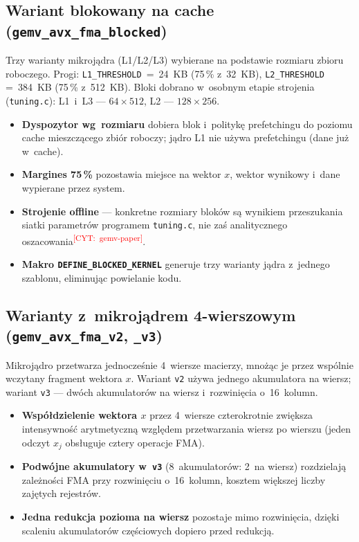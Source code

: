 \documentclass[a4paper,12pt]{book} %
\newcommand{\todocite}[1]{\textsuperscript{\textcolor{red}{[CYT:~#1]}}}
\newcommand{\kod}[1]{\texttt{#1}}
\begin{document}
\subsection{Wariant blokowany na cache (\kod{gemv\_avx\_fma\_blocked})}
Trzy warianty mikrojądra (L1/L2/L3) wybierane na podstawie rozmiaru zbioru
roboczego. Progi: \kod{L1\_THRESHOLD}~=~24~KB (75\,\% z~32~KB), \kod{L2\_THRESHOLD}
=~384~KB (75\,\% z~512~KB). Bloki dobrano w~osobnym etapie strojenia
(\kod{tuning.c}): L1~i~L3 --- \mbox{$64\times512$}, L2 --- \mbox{$128\times256$}.
\begin{itemize}
\item \textbf{Dyspozytor wg~rozmiaru} dobiera blok i~politykę prefetchingu do
  poziomu cache mieszczącego zbiór roboczy; jądro L1 nie używa prefetchingu
  (dane już w~cache).
\item \textbf{Margines 75\,\%} pozostawia miejsce na wektor $x$, wektor wynikowy
  i~dane wypierane przez system.
\item \textbf{Strojenie offline} --- konkretne rozmiary bloków są wynikiem
  przeszukania siatki parametrów programem \kod{tuning.c}, nie zaś analitycznego
  oszacowania\todocite{gemv-paper}.
\item \textbf{Makro \kod{DEFINE\_BLOCKED\_KERNEL}} generuje trzy warianty jądra
  z~jednego szablonu, eliminując powielanie kodu.
\end{itemize}

\subsection{Warianty z~mikrojądrem 4-wierszowym (\kod{gemv\_avx\_fma\_v2}, \kod{\_v3})}
Mikrojądro przetwarza jednocześnie 4~wiersze macierzy, mnożąc je przez wspólnie
wczytany fragment wektora $x$. Wariant \kod{v2} używa jednego akumulatora na
wiersz; wariant \kod{v3} --- dwóch akumulatorów na wiersz i~rozwinięcia o~16~kolumn.
\begin{itemize}
\item \textbf{Współdzielenie wektora $x$} przez 4~wiersze czterokrotnie zwiększa
  intensywność arytmetyczną względem przetwarzania wiersz po wierszu (jeden
  odczyt $x_j$ obsługuje cztery operacje FMA).
\item \textbf{Podwójne akumulatory w~\kod{v3}} (8~akumulatorów: 2~na wiersz)
  rozdzielają zależności FMA przy rozwinięciu o~16~kolumn, kosztem większej
  liczby zajętych rejestrów.
\item \textbf{Jedna redukcja pozioma na wiersz} pozostaje mimo rozwinięcia, dzięki
  scaleniu akumulatorów częściowych dopiero przed redukcją.
\end{itemize}
\end{document}
